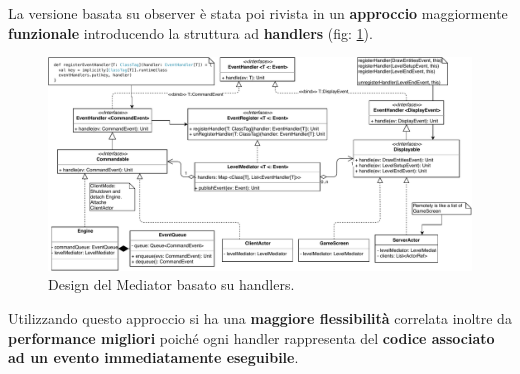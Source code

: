 La versione basata su observer è stata poi rivista in un \textbf{approccio} maggiormente \textbf{funzionale} introducendo la struttura ad \textbf{handlers} (fig: \ref{fig:mediatorHandler}).
\begin{figure}[H]
	\centering
	\includegraphics[width=0.99\columnwidth]{drawio/mediator/mediatorHandler.pdf}
	\caption{Design del Mediator basato su handlers.}
	\label{fig:mediatorHandler}
\end{figure}

Utilizzando questo approccio si ha una \textbf{maggiore flessibilità} correlata inoltre da \textbf{performance migliori} poiché ogni handler rappresenta del \textbf{codice associato ad un evento immediatamente eseguibile}.